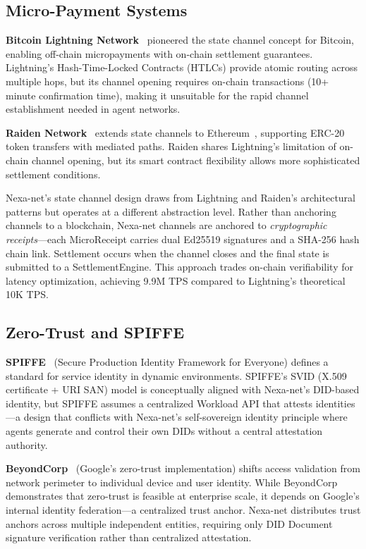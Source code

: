 \subsection{Micro-Payment Systems}

\textbf{Bitcoin Lightning Network}~\cite{lightning2016} pioneered the state channel concept for Bitcoin, enabling off-chain micropayments with on-chain settlement guarantees. Lightning's Hash-Time-Locked Contracts (HTLCs) provide atomic routing across multiple hops, but its channel opening requires on-chain transactions (10+ minute confirmation time), making it unsuitable for the rapid channel establishment needed in agent networks.

\textbf{Raiden Network}~\cite{raiden2017} extends state channels to Ethereum~\cite{buterin2014ethereum}, supporting ERC-20 token transfers with mediated paths. Raiden shares Lightning's limitation of on-chain channel opening, but its smart contract flexibility allows more sophisticated settlement conditions.

Nexa-net's state channel design draws from Lightning and Raiden's architectural patterns but operates at a different abstraction level. Rather than anchoring channels to a blockchain, Nexa-net channels are anchored to \emph{cryptographic receipts}---each MicroReceipt carries dual Ed25519 signatures and a SHA-256 hash chain link. Settlement occurs when the channel closes and the final state is submitted to a SettlementEngine. This approach trades on-chain verifiability for latency optimization, achieving 9.9M TPS compared to Lightning's theoretical 10K TPS.

\subsection{Zero-Trust and SPIFFE}

\textbf{SPIFFE}~\cite{spiffe2020} (Secure Production Identity Framework for Everyone) defines a standard for service identity in dynamic environments. SPIFFE's SVID (X.509 certificate + URI SAN) model is conceptually aligned with Nexa-net's DID-based identity, but SPIFFE assumes a centralized Workload API that attests identities---a design that conflicts with Nexa-net's self-sovereign identity principle where agents generate and control their own DIDs without a central attestation authority.

\textbf{BeyondCorp}~\cite{ward2016beyondcorp} (Google's zero-trust implementation) shifts access validation from network perimeter to individual device and user identity. While BeyondCorp demonstrates that zero-trust is feasible at enterprise scale, it depends on Google's internal identity federation---a centralized trust anchor. Nexa-net distributes trust anchors across multiple independent entities, requiring only DID Document signature verification rather than centralized attestation.

